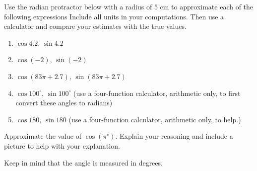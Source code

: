 \documentclass{ximera}
\begin{document}
\begin{question}\label{Exp1:CFsdfdfdseeFFR}
Use the radian protractor below with a radius of $5$ cm to approximate each of the following expressions
Include all units in your computations. Then use a calculator and compare your estimates with the true values.

 
\begin{onlineOnly}
    \begin{center}
\end{center}
\end{onlineOnly}


\begin{enumerate}

\item $\cos 4.2$, $\sin 4.2$  


\item $\cos (-2)$,  $\sin (-2)$ %

\item $\cos (83\pi + 2.7)$, $\sin (83\pi+2.7)$ 

\item $\cos 100^\circ$, $\sin 100^\circ$ (use a four-function calculator, arithmetic only, to first convert these angles to radians)

\item $\cos 180$, $\sin 180$ (use a four-function calculator, arithmetic only, to help.)

\end{enumerate}

\end{question}

\begin{question} \label{Q2:Cosine454}
Approximate the value of $\cos (\pi^\circ)$. Explain your reasoning and include a picture to help with your explanation.
\begin{hint}
Keep in mind that the angle is measured in degrees.
\end{hint}
\end{question}
\end{document}

